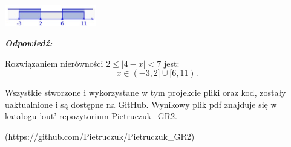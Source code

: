 \documentclass[12pt, a4paper]{report}
\begin{document}
    \bigskip

    \begin{center}
        \includegraphics[width=0.3\textwidth]{fig_8.jpg}
    \end{center}

    \vspace{20pt}                            %
    \noindent
    \emph{\textbf{Odpowiedź:}}

    Rozwiązaniem nierówności $2 \leq |4 - x| < 7$ jest:
    \[x \in (-3, 2] \cup [6, 11) \text{.}\]


    \vspace{100pt}                            %
    \noindent
    \begin{center}
    Wszystkie stworzone i wykorzystane w tym projekcie pliki oraz kod, zostały uaktualnione i są dostępne na GitHub. Wynikowy plik pdf znajduje się w katalogu 'out' repozytorium Pietruczuk\_GR2.

    (https://github.com/Pietruczuk/Pietruczuk\_GR2)
    \end{center}
\end{document}
